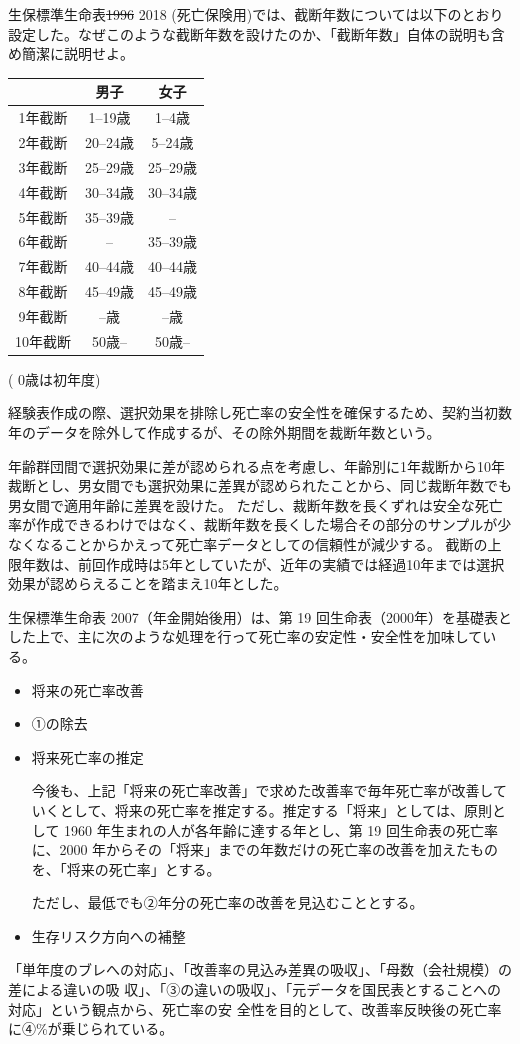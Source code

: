 \documentclass[report,gutter=10mm,fore-edge=10mm,uplatex,dvipdfmx]{jlreq}
\begin{document}

生保標準生命表\sout{1996} 2018 (死亡保険用)では、截断年数については以下のとおり設定した。なぜこのような截断年数を設けたのか、「截断年数」自体の説明も含め簡潔に説明せよ。

\begin{tabular}[t]{|c|c|c|}
\hline
 & 男子 &女子 \\
\hline
 1年截断& 1--19歳&1--4歳 \\
 2年截断& 20--24歳&5--24歳 \\
 3年截断& 25--29歳&25--29歳 \\
 4年截断& 30--34歳&30--34歳 \\
 5年截断& 35--39歳 & -- \\
 6年截断&  -- & 35--39歳 \\
 7年截断& 40--44歳   & 40--44歳 \\
 8年截断& 45--49歳   & 45--49歳 \\
 9年截断& --歳   & --歳 \\
 10年截断& 50歳--  & 50歳-- \\
\hline
\end{tabular}
( 0歳は初年度)

経験表作成の際、選択効果を排除し死亡率の安全性を確保するため、契約当初数年のデータを除外して作成するが、その除外期間を裁断年数という。

年齢群団間で選択効果に差が認められる点を考慮し、年齢別に1年裁断から10年裁断とし、男女間でも選択効果に差異が認められたことから、同じ裁断年数でも男女間で適用年齢に差異を設けた。
ただし、裁断年数を長くずれは安全な死亡率が作成できるわけではなく、裁断年数を長くした場合その部分のサンプルが少なくなることからかえって死亡率データとしての信頼性が減少する。
截断の上限年数は、前回作成時は5年としていたが、近年の実績では経過10年までは選択効果が認めらえることを踏まえ10年とした。


生保標準生命表 2007（年金開始後用）は、第 19 回生命表（2000年）を基礎表とした上で、主に次のような処理を行って死亡率の安定性・安全性を加味している。
\begin{itemize}
\tightlist
\item
  将来の死亡率改善
\item
  ①の除去
\item
  将来死亡率の推定

今後も、上記「将来の死亡率改善」で求めた改善率で毎年死亡率が改善していくとして、将来の死亡率を推定する。推定する「将来」としては、原則として 1960 年生まれの人が各年齢に達する年とし、第 19 回生命表の死亡率に、2000 年からその「将来」までの年数だけの死亡率の改善を加えたものを、「将来の死亡率」とする。


ただし、最低でも②年分の死亡率の改善を見込むこととする。
\item
     生存リスク方向への補整
\end{itemize}
「単年度のブレへの対応」、「改善率の見込み差異の吸収」、「母数（会社規模）の差による違いの吸
収」、「③の違いの吸収」、「元データを国民表とすることへの対応」という観点から、死亡率の安
全性を目的として、改善率反映後の死亡率に④\%が乗じられている。
\end{document}
